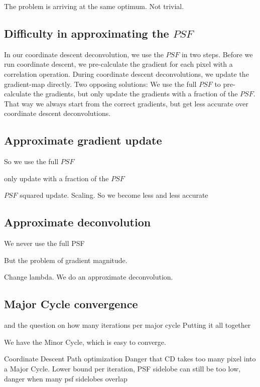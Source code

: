 The problem is arriving at the same optimum. Not trivial.



\subsection{Difficulty in approximating the $PSF$}

In our coordinate descent deconvolution, we use the $PSF$ in two steps. Before we run coordinate descent, we pre-calculate the gradient for each pixel with a correlation operation. During coordinate descent deconvolutions, we update the gradient-map directly. Two opposing solutions: We use the full $PSF$ to pre-calculate the gradients, but only update the gradients with a fraction of the $PSF$. That way we always start from the correct gradients, but get less accurate over coordinate descent deconvolutions.

\subsection{Approximate gradient update}

So we use the full $PSF$

only update with a fraction of the $PSF$

$PSF$ squared update. Scaling.
So we become less and less accurate


\subsection{Approximate deconvolution}

We never use the full PSF

But the problem of gradient magnitude. 

Change lambda. We do an approximate deconvolution. 


\subsection{Major Cycle convergence}
\cite{clark1980efficient} and the question on how many iterations per major cycle
Putting it all together

We have the Minor Cycle, which is easy to converge.

Coordinate Descent Path optimization \cite{friedman2010regularization}
Danger that CD takes too many pixel into a Major Cycle. Lower bound per iteration, PSF sidelobe
can still be too low, danger when many psf sidelobes overlap